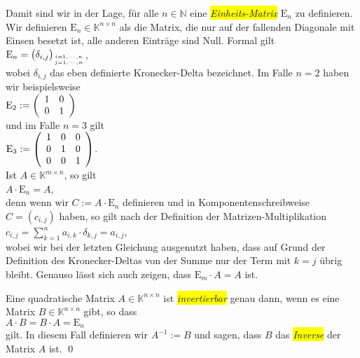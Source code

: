 Damit sind wir in der Lage, f\"{u}r alle $n \in \mathbb{N}$ eine \colorbox{yellow}{\emph{Einheits-Matrix}} $\mathrm{E}_n$ zu
definieren.  Wir definieren $\mathrm{E}_n \in \mathbb{K}^{n \times n}$ als die Matrix, die nur auf der
fallenden Diagonale mit Einsen besetzt ist, alle anderen Eintr\"{a}ge sind Null.  Formal
gilt
\\[0.2cm]
\hspace*{1.3cm}
$\mathrm{E}_n = \bigl(\delta_{i,j}\bigr)_{i=1,\cdots,n \atop j=1,\cdots,n}$,
\\[0.2cm]
wobei $\delta_{i,j}$ das eben definierte Kronecker-Delta bezeichnet.  
Im Falle $n = 2$ haben wir beispielsweise
\\[0.2cm]
\hspace*{1.3cm}
$\mathrm{E}_2 := \left(
  \begin{array}[c]{ll}
    1 & 0 \\
    0 & 1 \\
  \end{array}
  \right)
$
\\[0.2cm]
und im Falle $n = 3$ gilt
\\[0.2cm]
\hspace*{1.3cm}
$\mathrm{E}_3 := \left(
  \begin{array}[c]{lll}
    1 & 0 & 0 \\
    0 & 1 & 0 \\
    0 & 0 & 1 \\
  \end{array}
  \right)
$.
\\[0.2cm]
Ist $A \in \mathbb{K}^{m \times n}$,
so gilt
\\[0.2cm]
\hspace*{1.3cm}
$A \cdot \mathrm{E}_n = A$,
\\[0.2cm]
denn wenn wir $C := A \cdot \mathrm{E}_n$ definieren und in Komponentenschreibweise $C = (c_{i,j})$ haben, so
gilt nach der Definition der Matrizen-Multiplikation
\\[0.2cm]
\hspace*{1.3cm}
$c_{i,j} = \sum\limits_{k=1}^n a_{i,k} \cdot \delta_{k,j} = a_{i,j}$,
\\[0.2cm]
wobei wir bei der letzten Gleichung ausgenutzt haben, dass auf Grund der Definition des
Kronecker-Deltas von der Summe nur der Term mit $k = j$ \"{u}brig bleibt.  Genauso l\"{a}sst sich auch
zeigen, dass $\mathrm{E}_m \cdot A = A$ ist.

\begin{Definition}
  Eine quadratische Matrix $A \in \mathbb{K}^{n \times n}$ ist \colorbox{yellow}{\emph{invertierbar}} genau dann, wenn
  es eine Matrix $B \in \mathbb{K}^{n \times n}$ gibt, so dass 
  \\[0.2cm]
  \hspace*{1.3cm}
  $A \cdot B = B \cdot A = \mathrm{E}_n$
  \\[0.2cm]
  gilt.  In diesem Fall definieren wir $A^{-1} := B$ und sagen, dass $B$ das \colorbox{yellow}{\emph{Inverse}} der
  Matrix $A$ ist.  \qed
\end{Definition}

